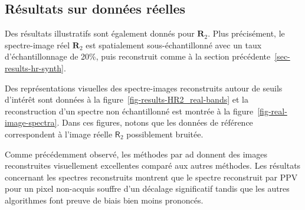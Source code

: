 \subsection{Résultats sur données réelles}

Des résultats illustratifs sont également donnés pour $\mathbf{R}_2$. Plus précisément, le spectre-image réel $\mathbf{R}_2$ est spatialement sous-échantillonné avec un taux d'échantillonnage de 20\%, puis reconstruit comme à la section précédente~\ref{sec-results-hr-synth}.

Des représentations visuelles des spectre-images reconstruits autour de seuils d'intérêt sont données à la figure~\ref{fig-results-HR2_real-bands} et la reconstruction d'un spectre non échantillonné est montrée à la figure~\ref{fig-real-image-spectra}. Dans ces figures, notons que les données de référence correspondent à l'image réelle $\mathsf{R}_2$ possiblement bruitée.

Comme précédemment observé, les méthodes par \gls{ad} donnent des images reconstruites visuellement excellentes comparé aux autres méthodes. Les résultats concernant les spectres reconstruits montrent que le spectre reconstruit par PPV pour un pixel non-acquis souffre d'un décalage significatif tandis que les autres algorithmes font preuve de biais bien moins prononcés. 


\begin{normalfigure*}[]
    \centering
    
    \caption{Résultats de reconstruction pour $\mathbf{R}_2$. Les images montrent la somme de 5 bandes autour de trois seuils particuliers ($\mathrm{O-K}$, $\mathrm{La-M}_{4, 5}$ et $\mathrm{Nd-M}_{4, 5}$). 
    Ces résultats confirment l'écart de performances entre PPV dont les images ne sont pas assez lisses et les méthodes par \gls{ad} qui sont proches de la référence avec un effet additionnel de débruitage. Les résultats de CLS sont clairement meilleurs que PPV et 3S et sont proches des résultats pour les méthodes par \gls{ad}. 
        \protect\label{fig-results-HR2_real-bands}}
\end{normalfigure*}


